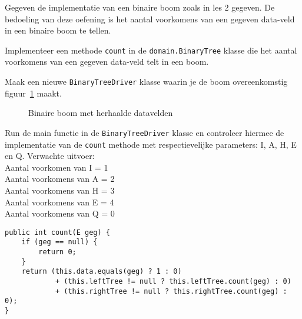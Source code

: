 \begin{oef}
\code Gegeven de implementatie van een binaire boom zoals in les 2 gegeven.
De bedoeling van deze oefening is het aantal voorkomens van een gegeven data-veld in een binaire boom te tellen.
\begin{oefenumerate}
\item Implementeer een methode \verb+count+ in de \verb+domain.BinaryTree+ klasse die het aantal voorkomens van een gegeven data-veld telt in een boom.
\item Maak een nieuwe \verb+BinaryTreeDriver+ klasse waarin je de boom overeenkomstig figuur~\ref{fig:herhalingsoefbb} maakt.
\begin{figure}[htbp]
    \centering
{}

\caption{Binaire boom met herhaalde datavelden}
    \label{fig:herhalingsoefbb}
\end{figure}
\item Run de main functie in de \verb+BinaryTreeDriver+ klasse en controleer hiermee de implementatie van de \verb+count+ methode met respectievelijke parameters: I, A, H, E en Q.
Verwachte uitvoer:\\
Aantal voorkomen van I = 1\\
Aantal voorkomens van A = 2\\
Aantal voorkomens van H = 3\\
Aantal voorkomens van E = 4\\
Aantal voorkomens van Q = 0\\
\end{oefenumerate}
\begin{opl}
\begin{lstlisting}[caption={count methode}, label=herhoefbbcount]
public int count(E geg) {
	if (geg == null) {
		return 0;
	}
	return (this.data.equals(geg) ? 1 : 0) 
			+ (this.leftTree != null ? this.leftTree.count(geg) : 0) 
			+ (this.rightTree != null ? this.rightTree.count(geg) : 0);
}
\end{lstlisting}
\end{opl}
\end{oef}


